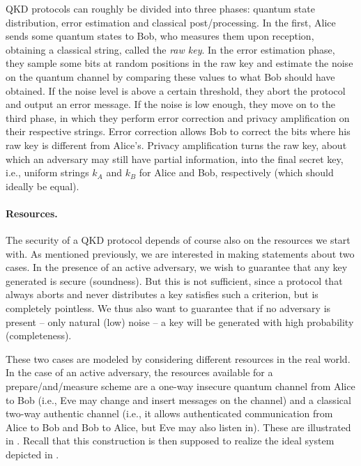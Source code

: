 QKD protocols can roughly be divided into three phases: quantum state
distribution, error estimation and classical post\-/processing. In the
first, Alice sends some quantum states to Bob, who measures them upon
reception, obtaining a classical string, called the \emph{raw key}.
In the error estimation phase, they sample some bits at random
positions in the raw key and estimate the noise on the quantum channel
by comparing these values to what Bob should have obtained. If the
noise level is above a certain threshold, they abort the protocol and
output an error message. If the noise is low enough, they move on to
the third phase, in which they perform error correction and privacy
amplification on their respective strings. Error correction allows Bob
to correct the bits where his raw key is different from
Alice's. Privacy amplification turns the raw key, about which an
adversary may still have partial information, into the final secret
key, i.e., uniform strings $k_A$ and $k_B$ for Alice and Bob,
respectively (which should ideally be equal).

\paragraph{Resources.} 
The security of a QKD protocol depends of course also on the resources
we start with. As mentioned previously, we are interested in making
 statements about two cases. In the presence of an active adversary, we
wish to guarantee that any key generated is secure (soundness). But
this is not sufficient, since a protocol that always aborts and never
distributes a key satisfies such a criterion, but is completely
pointless. We thus also want to guarantee that if no adversary is
present \--- only natural (low) noise \--- a key will be generated
with high probability (completeness).

These two cases are modeled by considering different resources in the
real world. In the case of an active adversary, the resources
available for a prepare\-/and\-/measure scheme are a one-way insecure
quantum channel from Alice to Bob (i.e., Eve may change and insert
messages on the channel) and a classical two-way authentic channel
(i.e., it allows authenticated communication from Alice to Bob and Bob
to Alice, but Eve may also listen in). These are illustrated in
. Recall that this construction is then
supposed to realize the ideal system depicted in
.


